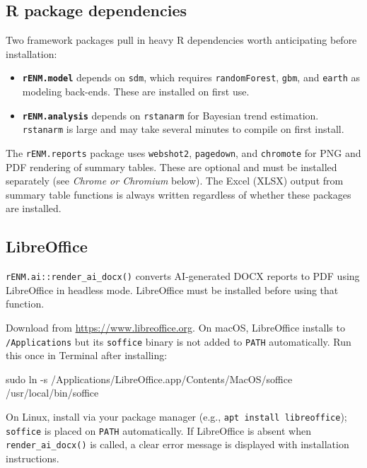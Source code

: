 \documentclass[
  letterpaper,
  DIV=11,
  numbers=noendperiod]{scrartcl}
\newenvironment{Shaded}{\begin{snugshade}}{\end{snugshade}}
\newcommand{\AttributeTok}[1]{\textcolor[rgb]{0.40,0.45,0.13}{#1}}
\newcommand{\FunctionTok}[1]{\textcolor[rgb]{0.28,0.35,0.67}{#1}}
\newcommand{\NormalTok}[1]{\textcolor[rgb]{0.00,0.23,0.31}{#1}}
\providecommand{\tightlist}{%
  \setlength{\itemsep}{0pt}\setlength{\parskip}{0pt}}
\begin{document}
\subsection{R package dependencies}\label{r-package-dependencies}

Two framework packages pull in heavy R dependencies worth anticipating
before installation:

\begin{itemize}
\tightlist
\item
  \textbf{\texttt{rENM.model}} depends on \texttt{sdm}, which requires
  \texttt{randomForest}, \texttt{gbm}, and \texttt{earth} as modeling
  back-ends. These are installed on first use.
\item
  \textbf{\texttt{rENM.analysis}} depends on \texttt{rstanarm} for
  Bayesian trend estimation. \texttt{rstanarm} is large and may take
  several minutes to compile on first install.
\end{itemize}

The \texttt{rENM.reports} package uses \texttt{webshot2},
\texttt{pagedown}, and \texttt{chromote} for PNG and PDF rendering of
summary tables. These are optional and must be installed separately (see
\emph{Chrome or Chromium} below). The Excel (XLSX) output from summary
table functions is always written regardless of whether these packages
are installed.

\subsection{LibreOffice}\label{libreoffice}

\texttt{rENM.ai::render\_ai\_docx()} converts AI-generated DOCX reports
to PDF using LibreOffice in headless mode. LibreOffice must be installed
before using that function.

Download from \url{https://www.libreoffice.org}. On macOS, LibreOffice
installs to \texttt{/Applications} but its \texttt{soffice} binary is
not added to \texttt{PATH} automatically. Run this once in Terminal
after installing:

\begin{Shaded}
\begin{Highlighting}[]
\FunctionTok{sudo}\NormalTok{ ln }\AttributeTok{{-}s}\NormalTok{ /Applications/LibreOffice.app/Contents/MacOS/soffice /usr/local/bin/soffice}
\end{Highlighting}
\end{Shaded}

On Linux, install via your package manager (e.g.,
\texttt{apt\ install\ libreoffice}); \texttt{soffice} is placed on
\texttt{PATH} automatically. If LibreOffice is absent when
\texttt{render\_ai\_docx()} is called, a clear error message is
displayed with installation instructions.
\end{document}
